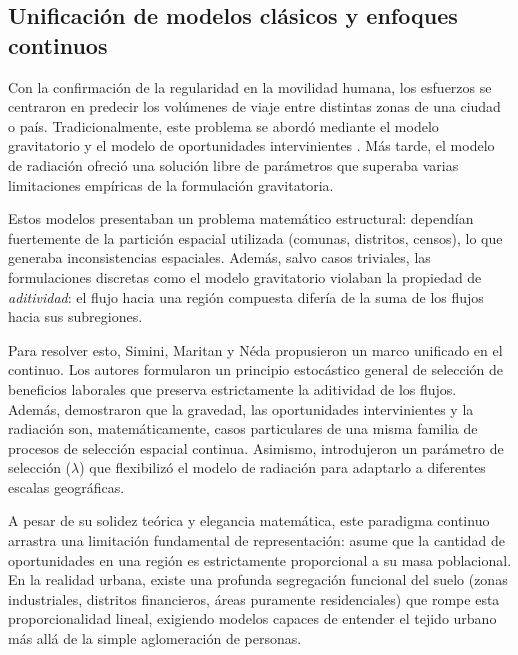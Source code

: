 \subsection{Unificación de modelos clásicos y enfoques continuos}
\label{sec:modelos_clasicos_continuos}

Con la confirmación de la regularidad en la movilidad humana, los esfuerzos se centraron en predecir los volúmenes de viaje entre distintas zonas de una ciudad o país. Tradicionalmente, este problema se abordó mediante el modelo gravitatorio \cite{zipf1946p} y el modelo de oportunidades intervinientes \cite{stouffer1940intervening}. Más tarde, el modelo de radiación \cite{simini2012universal} ofreció una solución libre de parámetros que superaba varias limitaciones empíricas de la formulación gravitatoria.

Estos modelos presentaban un problema matemático estructural: dependían fuertemente de la partición espacial utilizada (comunas, distritos, censos), lo que generaba inconsistencias espaciales. Además, salvo casos triviales, las formulaciones discretas como el modelo gravitatorio violaban la propiedad de \textit{aditividad}: el flujo hacia una región compuesta difería de la suma de los flujos hacia sus subregiones.

Para resolver esto, Simini, Maritan y N\'eda \cite{simini2013human} propusieron un marco unificado en el continuo. Los autores formularon un principio estocástico general de selección de beneficios laborales que preserva estrictamente la aditividad de los flujos. Además, demostraron que la gravedad, las oportunidades intervinientes y la radiación son, matemáticamente, casos particulares de una misma familia de procesos de selección espacial continua. Asimismo, introdujeron un parámetro de selección ($\lambda$) que flexibilizó el modelo de radiación para adaptarlo a diferentes escalas geográficas.

A pesar de su solidez teórica y elegancia matemática, este paradigma continuo arrastra una limitación fundamental de representación: asume que la cantidad de oportunidades en una región es estrictamente proporcional a su masa poblacional. En la realidad urbana, existe una profunda segregación funcional del suelo (zonas industriales, distritos financieros, áreas puramente residenciales) que rompe esta proporcionalidad lineal, exigiendo modelos capaces de entender el tejido urbano más allá de la simple aglomeración de personas.

